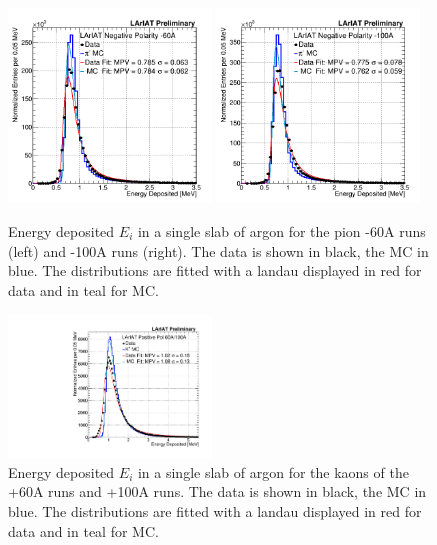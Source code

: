 \begin{figure}[htb]
\centering
\includegraphics[width=0.48\textwidth]{Chapter-5/Images/DepEnergy_Fit_v4.png}
\includegraphics[width=0.48\textwidth]{Chapter-5/Images/DepEnergy_Fit_v4100A.png}
\caption[]{ Energy deposited  $E_{i}$ in a single slab of argon for the pion -60A runs (left) and -100A runs (right).  The data is shown in black, the MC in blue. The distributions are fitted with a landau displayed in red for data and in teal for MC. } \label{fig:EnergyDeposited}
\end{figure}

\begin{figure}[htb]
\centering
\includegraphics[width=0.48\textwidth]{Chapter-5/Images/KaonEdep.pdf}
\caption[]{ Energy deposited  $E_{i}$ in a single slab of argon for the kaons of the +60A runs and +100A runs.  The data is shown in black, the MC in blue. The distributions are fitted with a landau displayed in red for data and in teal for MC. } \label{fig:EnergyDepositedK}
\end{figure}




